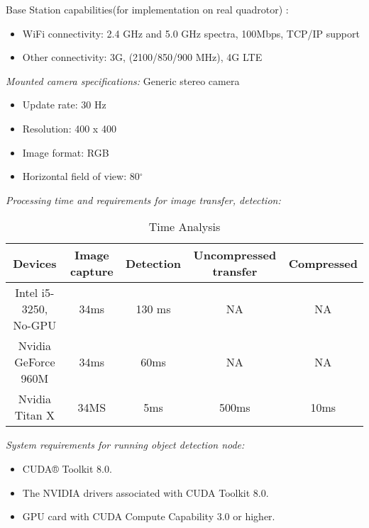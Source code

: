 	\noindent Base Station capabilities(for implementation on real quadrotor) :
	
	\begin{itemize}
		\item WiFi connectivity: 2.4 GHz and 5.0 GHz spectra,  100Mbps, TCP/IP support \vspace{-5mm}
		\vspace{-5mm}\item Other connectivity: 3G, (2100/850/900 MHz), 4G LTE
	\end{itemize}
		
\noindent\emph{Mounted camera specifications:}
	Generic stereo camera \vspace{-5mm}
	\begin{itemize}
		\item Update rate: 30 Hz \vspace{-5mm}
		\item Resolution: 400 x 400 \vspace{-5mm}
		\item Image format: RGB \vspace{-5mm}
		\item Horizontal field of view: 80$^{\circ}$ 
	\end{itemize}
	
\emph{Processing time and requirements for image transfer, detection:}

\begin{table}[h]
	\centering
	\begin{tabular}{| c | c | c | c | c |}
		\hline
		Devices	& Image capture & Detection	& Uncompressed transfer & Compressed	\\ \hline  \hline
		Intel i5-3250, No-GPU		& 34ms	& 130 ms	& NA	& NA\\ \hline
		Nvidia GeForce 960M	& 34ms	& 60ms	& NA	& NA\\ \hline
		Nvidia Titan X		& 34MS		& 5ms		& 500ms		& 10ms	\\ \hline
	\end{tabular}
	\caption{Time Analysis}
	\label{table:Time Analysis}
\end{table}

\emph{System requirements for running object detection node:}
	\begin{itemize}
		\item CUDA® Toolkit 8.0. \vspace{-5mm}
		\item The NVIDIA drivers associated with CUDA Toolkit 8.0. \vspace{-5mm}
		\item GPU card with CUDA Compute Capability 3.0 or higher. 
	\end{itemize}


